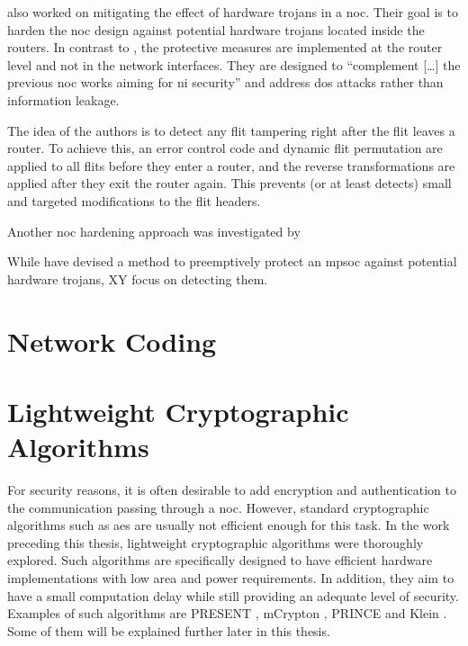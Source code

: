 \citeauthor{frey17hardenednoc} \cite{frey17hardenednoc} also worked on mitigating the effect of hardware trojans in a \gls{noc}. Their goal is to
harden the \gls{noc} design against potential hardware trojans located inside the routers. In contrast to \citeauthor{ancajas14fortnocs}
\cite{ancajas14fortnocs}, the protective measures are implemented at the router level and not in the network interfaces. They are designed to
\enquote{complement […] the previous \gls{noc} works aiming for \gls{ni} security} \cite[16]{frey17hardenednoc} and address \gls{dos} attacks rather
than information leakage.

The idea of the authors is to detect any flit tampering right after the flit leaves a router. To achieve this, an error control code and dynamic flit
permutation are applied to all flits before they enter a router, and the reverse transformations are applied after they exit the router again. This
prevents (or at least detects) small and targeted modifications to the flit headers. %

Another \gls{noc} hardening approach was investigated by 

While \citeauthor{ancajas14fortnocs} have devised a method to preemptively protect an \gls{mpsoc} against potential hardware trojans, XY focus on
detecting them.

\section{Network Coding}\label{sec:networkcodingrel}

\section{Lightweight Cryptographic Algorithms}\label{sec:lightweightcrypto}
For security reasons, it is often desirable to add encryption and authentication to the communication passing through a \gls{noc}. However,
standard cryptographic algorithms such as \gls{aes} are usually not efficient enough for this task. \cite[1]{bogdanov07present}
In the work preceding this thesis, lightweight cryptographic algorithms were thoroughly explored. \cite{harttung17lightweightcrypto} Such
algorithms are
specifically designed to have efficient hardware implementations with low area and power requirements. In addition, they aim to have a small
computation delay while still providing an adequate level of security. Examples of such algorithms are PRESENT \cite{bogdanov07present},
mCrypton \cite{lim06mcrypton}, PRINCE \cite{borghoff12prince} and Klein \cite{gong12klein}. Some of them will be explained further later in this
thesis. %

